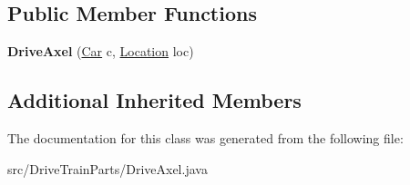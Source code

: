 \subsection*{Public Member Functions}
\begin{DoxyCompactItemize}
\item 
\hypertarget{classDriveTrainParts_1_1DriveAxel_a10144004573000625364f2d4cc39b954}{}{\bfseries Drive\+Axel} (\hyperlink{classCars_1_1Car}{Car} c, \hyperlink{enumEnums_1_1Location}{Location} loc)\label{classDriveTrainParts_1_1DriveAxel_a10144004573000625364f2d4cc39b954}

\end{DoxyCompactItemize}
\subsection*{Additional Inherited Members}


The documentation for this class was generated from the following file\+:\begin{DoxyCompactItemize}
\item 
src/\+Drive\+Train\+Parts/Drive\+Axel.\+java\end{DoxyCompactItemize}
